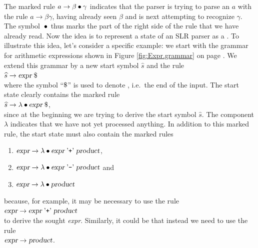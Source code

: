 \noindent
The marked rule \(a \rightarrow \beta \mdot \gamma\) indicates that the parser is trying to parse an \(a\)
with the rule \(a \rightarrow \beta \gamma\), having already seen \(\beta\) and is next attempting to recognize
\(\gamma\). The symbol \(\mdot\) thus marks the part of the right side of the rule that we have
already read.  Now the idea is to represent a state of an SLR parser as a . To illustrate
this idea, let's consider a specific example: we start with the grammar for arithmetic expressions shown in
Figure \ref{fig:Expr.grammar} on page \pageref{fig:Expr.grammar}. We extend this grammar by a new start symbol
\(\widehat{s}\) and the rule 
\\[0.2cm]
\hspace*{1.3cm} \(\widehat{s} \rightarrow  \textsl{expr}\;\symbol{36}\)
\\[0.2cm]
where the symbol ``$\symbol{36}$'' is used to denote , i.e.~the end of the input.
The start state clearly contains the marked rule
\\[0.2cm]
\hspace*{1.3cm} \(\widehat{s} \rightarrow \lambda \mdot \textsl{expr}\; \symbol{36}\),
\\[0.2cm]
since at the beginning we are trying to derive the start symbol \(\widehat{s}\).
The component \(\lambda\) indicates that we have not yet processed anything. In addition to this marked rule, the start state must also contain the marked rules
\begin{enumerate}
\item \(\textsl{expr} \rightarrow \lambda \mdot \textsl{expr} \aquoted{+} \textsl{product}\),
\item \(\textsl{expr} \rightarrow \lambda \mdot \textsl{expr} \aquoted{-} \textsl{product}\) \qquad and
\item \(\textsl{expr} \rightarrow \lambda \mdot \textsl{product}\)
\end{enumerate}
because, for example, it may be necessary to use the rule
\\[0.2cm]
\hspace*{1.3cm}
\(\textsl{expr} \rightarrow \textsl{expr} \;\mbox{'\texttt{+}'}\; \textsl{product}\)
\\[0.2cm]  
to derive the sought \textsl{expr}. Similarly, it could be that instead we need to use the rule
\\[0.2cm]
\hspace*{1.3cm}
\(\textsl{expr} \rightarrow \textsl{product}\).
\\[0.2cm]
